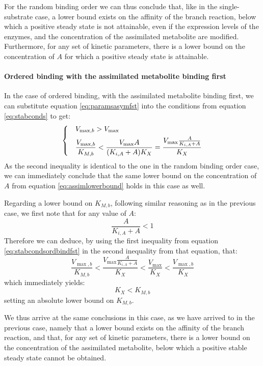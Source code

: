   For the random binding order we can thus conclude that, like in the single-substrate case, a lower bound exists on the affinity of the branch reaction, below which a positive steady state is not attainable, even if the expression levels of the enzymes, and the concentration of the assimilated metabolite are modified.
  Furthermore, for any set of kinetic parameters, there is a lower bound on the concentration of $A$ for which a positive steady state is attainable.

  \paragraph{Ordered binding with the assimilated metabolite binding first}
  In the case of ordered binding, with the assimilated metabolite binding first, we can substitute equation \ref{eq:paramsasymfst} into the conditions from equation \ref{eq:stabconds} to get:
  \begin{equation}
    \label{eq:stabcondsordbindfst}
    \begin{dcases}
      & V_{\max,b}>V_{\max} \\
      & \frac{V_{\max,b}}{K_{M,b}}<\frac{V_{\max}A}{(K_{i,A}+A)K_X}=\frac{V_{\max}\frac{A}{K_{i,A}+A}}{K_X}
    \end{dcases}
  \end{equation}
  As the second inequality is identical to the one in the random binding order case, we can immediately conclude that the same lower bound on the concentration of $A$ from equation \ref{eq:assimlowerbound} holds in this case as well.

  Regarding a lower bound on $K_{M,b}$, following similar reasoning as in the previous case, we first note that for any value of $A$:
  \begin{equation*}
    \frac{A}{K_{i,A}+A}<1
  \end{equation*}
  Therefore we can deduce, by using the first inequality from equation \ref{eq:stabcondsordbindfst} in the second inequality from that equation, that:
  \begin{equation*}
    \frac{V_{\max,b}}{K_{M,b}}<\frac{V_{\max}\frac{A}{K_{i,A}+A}}{K_X}<\frac{V_{\max}}{K_X}<\frac{V_{\max,b}}{K_X}
  \end{equation*}
  which immediately yields:
  \begin{equation}
    \label{eq:ordkbbound}
    K_X<K_{M,b}
  \end{equation}
  setting an absolute lower bound on $K_{M,b}$.

  We thus arrive at the same conclusions in this case, as we have arrived to in the previous case, namely that a lower bound exists on the affinity of the branch reaction, and that, for any set of kinetic parameters, there is a lower bound on the concentration of the assimilated metabolite, below which a positive stable steady state cannot be obtained.


